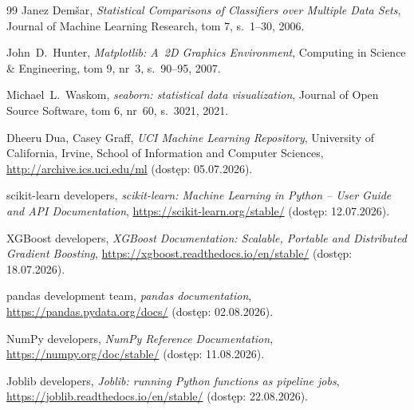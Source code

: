 \begin{thebibliography}{99}
Janez Dem\v{s}ar, {\it Statistical Comparisons of Classifiers over Multiple Data Sets}, Journal of Machine Learning Research, tom 7, s.~1--30, 2006.

John~D.~Hunter, {\it Matplotlib: A~2D Graphics Environment}, Computing in Science \& Engineering, tom 9, nr~3, s.~90--95, 2007.

Michael~L.~Waskom, {\it seaborn: statistical data visualization}, Journal of Open Source Software, tom 6, nr~60, s.~3021, 2021.

Dheeru Dua, Casey Graff, {\it UCI Machine Learning Repository}, University of California, Irvine, School of Information and Computer Sciences, \url{http://archive.ics.uci.edu/ml} (dostęp: 05.07.2026).

scikit-learn developers, {\it scikit-learn: Machine Learning in Python -- User Guide and API Documentation}, \url{https://scikit-learn.org/stable/} (dostęp: 12.07.2026).

XGBoost developers, {\it XGBoost Documentation: Scalable, Portable and Distributed Gradient Boosting}, \url{https://xgboost.readthedocs.io/en/stable/} (dostęp: 18.07.2026).

pandas development team, {\it pandas documentation}, \url{https://pandas.pydata.org/docs/} (dostęp: 02.08.2026).

NumPy developers, {\it NumPy Reference Documentation}, \url{https://numpy.org/doc/stable/} (dostęp: 11.08.2026).

Joblib developers, {\it Joblib: running Python functions as pipeline jobs}, \url{https://joblib.readthedocs.io/en/stable/} (dostęp: 22.08.2026).

\end{thebibliography}
